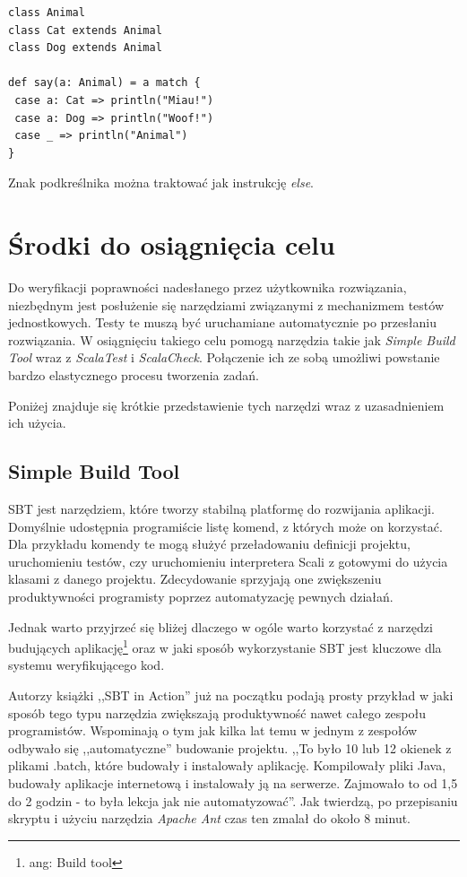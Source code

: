 \documentclass[brudnopis]{xmgr}
\begin{document}
\begin{verbatim}
class Animal
class Cat extends Animal
class Dog extends Animal

def say(a: Animal) = a match {
 case a: Cat => println("Miau!")
 case a: Dog => println("Woof!")
 case _ => println("Animal")
}
\end{verbatim}

Znak podkreślnika można traktować jak instrukcję \emph{else}.

\section{Środki do osiągnięcia celu}

Do weryfikacji poprawności nadesłanego przez użytkownika rozwiązania, niezbędnym jest posłużenie się narzędziami związanymi z mechanizmem testów jednostkowych. Testy te muszą być uruchamiane automatycznie po przesłaniu rozwiązania. W osiągnięciu takiego celu pomogą narzędzia takie jak \textit{Simple Build Tool} wraz z \textit{ScalaTest} i \textit{ScalaCheck}. Połączenie ich ze sobą umożliwi powstanie bardzo elastycznego procesu tworzenia zadań. 

Poniżej znajduje się krótkie przedstawienie tych narzędzi wraz z uzasadnieniem ich użycia. 

\subsection{Simple Build Tool}

SBT jest narzędziem, które tworzy stabilną platformę do rozwijania aplikacji. Domyślnie udostępnia programiście listę komend, z których może on korzystać. Dla przykładu komendy te mogą służyć przeładowaniu definicji projektu, uruchomieniu testów, czy uruchomieniu interpretera Scali z gotowymi do użycia klasami z danego projektu. Zdecydowanie sprzyjają one zwiększeniu produktywności programisty poprzez automatyzację pewnych działań.

Jednak warto przyjrzeć się bliżej dlaczego w ogóle warto korzystać z narzędzi budujących aplikację\footnote{ang: Build tool} oraz w jaki sposób wykorzystanie SBT jest kluczowe dla systemu weryfikującego kod. 

Autorzy książki ,,SBT in Action'' już na początku podają prosty przykład w jaki sposób tego typu narzędzia zwiększają produktywność nawet całego zespołu programistów. Wspominają o tym jak kilka lat temu w jednym z zespołów odbywało się ,,automatyczne'' budowanie projektu. ,,To było 10 lub 12 okienek z plikami .batch, które budowały i instalowały aplikację. Kompilowały pliki Java, budowały aplikacje internetową i instalowały ją na serwerze. Zajmowało to od 1,5 do 2 godzin - to była lekcja jak nie automatyzować''.\cite[s.1]{Suereth:2014:SIA} Jak twierdzą, po przepisaniu skryptu i użyciu narzędzia \emph{Apache Ant} czas ten zmalał do około 8 minut.
\end{document}

